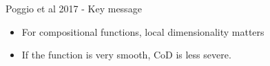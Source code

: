 \documentclass[aspectratio=169]{beamer} %
\begin{document}
\begin{frame}{Poggio et al 2017 - Key message}
\begin{itemize}
    \item For compositional functions, local dimensionality matters
    \item If the function is very smooth, CoD is less severe.
\end{itemize}
    
\end{frame}
    
    

    
\end{document}
